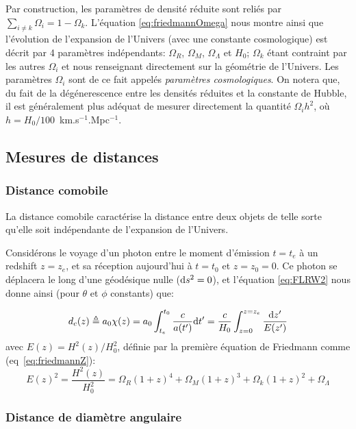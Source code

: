 \documentclass[../main/main.tex]{subfiles}
\begin{document}
Par construction, les paramètres de densité réduite sont reliés par
$\sum_{i\ne k}\Omega_{i}=1-\Omega_{k}$.
L'équation \ref{eq:friedmannOmega} nous montre ainsi que l'évolution de
l'expansion de l'Univers (avec une constante cosmologique) est décrit par 4 paramètres indépendants:
$\Omega_{R}$, $\Omega_{M}$, $\Omega_{\Lambda}$ et $H_{0}$; $\Omega_{k}$
étant contraint par les autres $\Omega_{i}$ et nous renseignant
directement sur la géométrie de l'Univers. Les paramètres $\Omega_{i}$
sont de ce fait appelés \textit{paramètres cosmologiques}. On notera
que, du fait de 
la dégénerescence entre les densités réduites et la constante de Hubble,
il est généralement plus adéquat de mesurer directement la quantité
$\Omega_{i}h^{2}$, où \mbox{$h=H_{0}/100$ km.s$^{-1}$.Mpc$^{-1}$}.

\subsection{Mesures de distances}

\subsubsection*{Distance comobile}
La distance comobile caractérise la distance entre deux objets
de telle sorte qu'elle soit indépendante de l'expansion de
l'Univers.

Considérons le voyage d'un photon entre le moment d'émission $t=t_{e}$
à un redshift $z=z_{e}$, et sa réception aujourd'hui à $t=t_{0}$ et
$z=z_{0}=0$. Ce photon se déplacera le long d'une géodésique nulle ($\mathrm{d}
s^{2}=0$), et l'équation \ref{eq:FLRW2} nous donne ainsi (pour $\theta$
et $\phi$ constants) que:

\begin{equation}
  \label{eq:distcomobil}
  d_{c}(z)\triangleq a_{0}\chi(z)=a_{0}\int^{t_{0}}_{t_{e}}\frac{c}{a(t')}\mathrm{d}
  t'=\frac{c}{H_{0}}\int_{z=0}^{z=z_{e}}\frac{\mathrm{d} z'}{E(z')}
\end{equation}
avec $E(z)=H^{2}(z)/H_{0}^{2}$, définie par la première équation de
Friedmann comme (eq~\ref{eq:friedmannZ}):
\begin{equation}
  \label{eq:Ez}
  E(z)^{2}=\frac{H^{2}(z)}{H_{0}^{2}}=\Omega_{R}(1+z)^{4}
  +\Omega_{M}(1+z)^{3} +\Omega_{k}(1+z)^{2}+\Omega_{\Lambda}
\end{equation}

\subsubsection*{Distance de diamètre angulaire}
\end{document}
